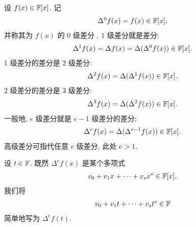 \begin{definition}
    设 $f(x) \in \mathbb{F}[x]$. 记
    \begin{align*}
        \Delta^0 f(x) = f(x) \in \mathbb{F}[x],
    \end{align*}
    并称其为 $f(x)$ 的 $0$ 级差分 . $1$ 级差分就是差分:
    \begin{align*}
        \Delta^1 f(x) = \Delta f(x) = \Delta (\Delta^0 f(x)) \in \mathbb{F}[x].
    \end{align*}
    $1$ 级差分的差分是 $2$ 级差分:
    \begin{align*}
        \Delta^2 f(x) = \Delta (\Delta^1 f(x)) \in \mathbb{F}[x].
    \end{align*}
    $2$ 级差分的差分是 $3$ 级差分:
    \begin{align*}
        \Delta^3 f(x) = \Delta (\Delta^2 f(x)) \in \mathbb{F}[x].
    \end{align*}
    一般地, $e$ 级差分就是 $e - 1$ 级差分的差分:
    \begin{align*}
        \Delta^e f(x) = \Delta (\Delta^{e-1} f(x)) \in \mathbb{F}[x].
    \end{align*}
    高级差分可指代任意 $e$ 级差分, 此处 $e > 1$.

    设 $t \in \mathbb{F}$. 既然 $\Delta^e f(x)$ 是某个多项式
    \begin{align*}
        v_0 + v_1 x + \cdots + v_s x^s \in \mathbb{F}[x],
    \end{align*}
    我们将
    \begin{align*}
        v_0 + v_1 t + \cdots + v_s t^s \in \mathbb{F}
    \end{align*}
    简单地写为 $\Delta^e f(t)$.
\end{definition}

